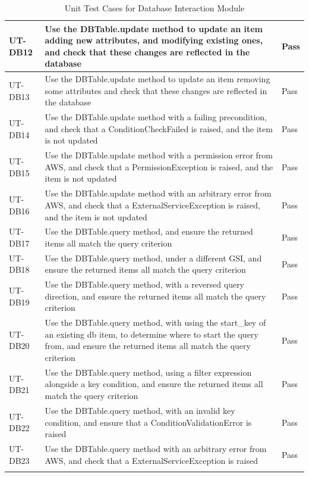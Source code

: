 \documentclass[12pt, titlepage]{article}
\begin{document}
\begin{longtable}{|m{2cm}|m{10cm}|m{1.4cm}|}
  UT-DB12 & Use the DBTable.update method to update an item adding
  new attributes, and modifying existing ones, and check that these
  changes are reflected in the database & Pass\\ \hline
  UT-DB13 & Use the DBTable.update method to update an item removing
  some attributes and check that these changes are reflected in the
  database & Pass\\ \hline
  UT-DB14 & Use the DBTable.update method with a failing
  precondition, and check that a ConditionCheckFailed is raised, and
  the item is not updated & Pass\\ \hline
  UT-DB15 & Use the DBTable.update method with a permission error
  from AWS, and check that a PermissionException is raised, and the
  item is not updated & Pass\\ \hline
  UT-DB16 & Use the DBTable.update method with an arbitrary error
  from AWS, and check that a ExternalServiceException is raised, and
  the item is not updated & Pass\\ \hline
  UT-DB17 & Use the DBTable.query method, and ensure the returned
  items all match the query criterion & Pass\\ \hline
  UT-DB18 & Use the DBTable.query method, under a different GSI, and
  ensure the returned items all match the query criterion & Pass\\ \hline
  UT-DB19 & Use the DBTable.query method, with a reversed query
  direction, and ensure the returned items all match the query
  criterion & Pass\\ \hline
  UT-DB20 & Use the DBTable.query method, with using the start\_key
  of an existing db item, to determine where to start the query from,
  and ensure the returned items all match the query criterion & Pass\\ \hline
  UT-DB21 & Use the DBTable.query method, using a filter expression
  alongside a key condition, and ensure the returned items all match
  the query criterion & Pass\\ \hline
  UT-DB22 & Use the DBTable.query method, with an invalid key
  condition, and ensure that a ConditionValidationError is raised &
  Pass\\ \hline
  UT-DB23 & Use the DBTable.query method with an arbitrary error
  from AWS, and check that a ExternalServiceException is raised & Pass\\ \hline
  \caption{Unit Test Cases for Database Interaction Module}
\end{longtable}
\end{document}
